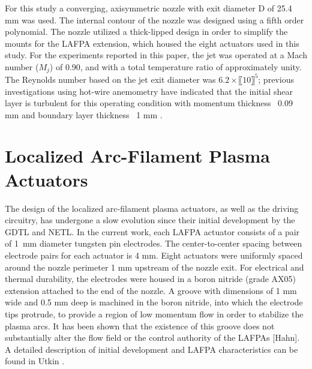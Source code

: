 For this study a converging, axisymmetric nozzle with exit diameter D of 25.4 mm was used. 
The internal contour of the nozzle was designed using a fifth order polynomial. 
The nozzle utilized a thick-lipped design in order to simplify the mounts for the LAFPA extension, which housed the eight actuators used in this study. 
For the experiments reported in this paper, the jet was operated at a Mach number ($M_j$) of 0.90, and with a total temperature ratio of approximately unity. 
The Reynolds number based on the jet exit diameter was $6.2\times〖10〗^5$; previous investigations using hot-wire anemometry have indicated that the initial shear layer is turbulent for this operating condition with momentum thickness ~0.09 mm and boundary layer thickness ~1 mm \citep{Kearney-Fischer2009}.

\section{Localized Arc-Filament Plasma Actuators}
The design of the localized arc-filament plasma actuators, as well as the driving circuitry, has undergone a slow evolution since their initial development by the GDTL and NETL.
In the current work, each LAFPA actuator consists of a pair of 1~mm diameter tungsten pin electrodes.
The center-to-center spacing between electrode pairs for each actuator is 4 mm.
Eight actuators were uniformly spaced around the nozzle perimeter 1 mm upstream of the nozzle exit. 
For electrical and thermal durability, the electrodes were housed in a boron nitride (grade AX05) extension attached to the end of the nozzle. 
A groove with dimensions of 1 mm wide and 0.5 mm deep is machined in the boron nitride, into which the electrode tips protrude, to provide a region of low momentum flow in order to stabilize the plasma arcs. 
It has been shown that the existence of this groove does not substantially alter the flow field or the control authority of the LAFPAs [Hahn]. 
A detailed description of initial development and LAFPA characteristics can be found in Utkin \etal \citep{Utkin2007}.


